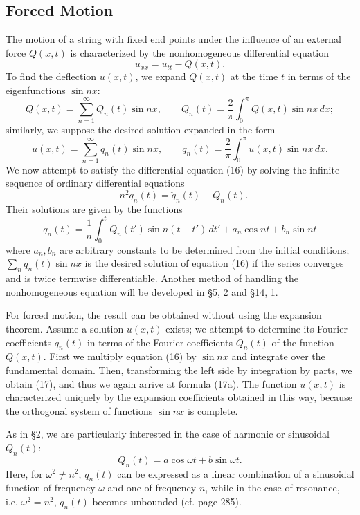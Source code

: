 \subsection{Forced Motion}
The motion of a string with fixed end points under the influence of an external force $Q(x,t)$ is characterized by the nonhomogeneous differential equation
\begin{equation}\tag{16}
u_{xx}=u_{tt}-Q(x,t).
\end{equation}
To find the deflection $u(x,t)$, we expand $Q(x,t)$ at the time $t$ in terms of the eigenfunctions $\sin nx$:
\[
Q(x,t)=\sum_{n=1}^{\infty}Q_n(t)\sin nx,
\qquad
Q_n(t)=\frac2\pi\int_0^\pi Q(x,t)\sin nx\,dx;
\]
similarly, we suppose the desired solution expanded in the form
\[
u(x,t)=\sum_{n=1}^{\infty}q_n(t)\sin nx,
\qquad
q_n(t)=\frac2\pi\int_0^\pi u(x,t)\sin nx\,dx.
\]
We now attempt to satisfy the differential equation (16) by solving the infinite sequence of ordinary differential equations
\begin{equation}\tag{17}
-n^2q_n(t)=\ddot q_n(t)-Q_n(t).
\end{equation}
Their solutions are given by the functions
\begin{equation}\tag{17a}
q_n(t)=\frac1n\int_0^tQ_n(t')\sin n(t-t')\,dt'+a_n\cos nt+b_n\sin nt
\end{equation}
where $a_n,b_n$ are arbitrary constants to be determined from the initial conditions; $\sum_nq_n(t)\sin nx$ is the desired solution of equation (16) if the series converges and is twice termwise differentiable. Another method of handling the nonhomogeneous equation will be developed in \S5, 2 and \S14, 1.

For forced motion, the result can be obtained without using the expansion theorem. Assume a solution $u(x,t)$ exists; we attempt to determine its Fourier coefficients $q_n(t)$ in terms of the Fourier coefficients $Q_n(t)$ of the function $Q(x,t)$. First we multiply equation (16) by $\sin nx$ and integrate over the fundamental domain. Then, transforming the left side by integration by parts, we obtain (17), and thus we again arrive at formula (17a). The function $u(x,t)$ is characterized uniquely by the expansion coefficients obtained in this way, because the orthogonal system of functions $\sin nx$ is complete.

As in \S2, we are particularly interested in the case of harmonic or sinusoidal $Q_n(t)$:
\[
Q_n(t)=a\cos\omega t+b\sin\omega t.
\]
Here, for $\omega^2\ne n^2$, $q_n(t)$ can be expressed as a linear combination of a sinusoidal function of frequency $\omega$ and one of frequency $n$, while in the case of resonance, i.e. $\omega^2=n^2$, $q_n(t)$ becomes unbounded (cf. page 285).

